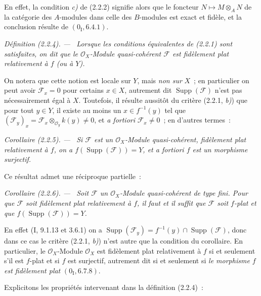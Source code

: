\documentclass[10pt,oneside]{book}
\newcommand{\oldpage}[2][]{%
  \setcounter{footnote}{0}%
  \marginpar{\scriptsize\textbf{#1}~|~#2}\ignorespaces}
\newenvironment{definition}[1][]{%
  \par\medskip\noindent\itshape Définition (#1). ---\ }{\par}
\newenvironment{corollary}[1][]{%
  \par\medskip\noindent\itshape Corollaire (#1). ---\ }{\par}
\begin{document}
En effet, la condition \emph{c)} de (2.2.2) signifie alors que le foncteur
$N\mapsto M\otimes_A N$ de la catégorie des $A$-modules dans celle des
$B$-modules est exact et fidèle, et la conclusion résulte de
$(0_{\mathrm I},6.4.1)$.

\begin{definition}[2.2.4]
\label{IV.2.2.4-fr}
Lorsque les conditions équivalentes de (2.2.1) sont satisfaites, on dit que
le $\mathcal O_X$-Module quasi-cohérent $\mathscr F$ est \emph{fidèlement plat
relativement à} $f$ (ou à $Y$).
\end{definition}

\oldpage[IV-2]{11}
On notera que cette notion est locale sur $Y$, mais \emph{non sur} $X$~; en
particulier on peut avoir $\mathscr F_x=0$ pour certains $x\in X$, autrement
dit $\operatorname{Supp}(\mathscr F)$ n'est pas nécessairement égal à $X$.
Toutefois, il résulte aussitôt du critère (2.2.1, \emph{b)}) que pour tout
$y\in Y$, il existe au moins un $x\in f^{-1}(y)$ tel que
$(\mathscr F_y)_x=\mathscr F_x\otimes_{\mathcal O_y}k(y)\neq0$, et
\emph{a fortiori} $\mathscr F_x\neq0$~; en d'autres termes~:

\begin{corollary}[2.2.5]
\label{IV.2.2.5-fr}
Si $\mathscr F$ est un $\mathcal O_X$-Module quasi-cohérent, fidèlement plat
relativement à $f$, on a $f(\operatorname{Supp}(\mathscr F))=Y$, et
\emph{a fortiori} $f$ est un morphisme surjectif.
\end{corollary}

Ce résultat admet une réciproque partielle~:

\begin{corollary}[2.2.6]
\label{IV.2.2.6-fr}
Soit $\mathscr F$ un $\mathcal O_X$-Module quasi-cohérent de type fini. Pour
que $\mathscr F$ soit fidèlement plat relativement à $f$, il faut et il
suffit que $\mathscr F$ soit $f$-plat et que
$f(\operatorname{Supp}(\mathscr F))=Y$.
\end{corollary}

En effet (I, 9.1.13 et 3.6.1) on a
$\operatorname{Supp}(\mathscr F_y)=f^{-1}(y)\cap\operatorname{Supp}(\mathscr F)$,
donc dans ce cas le critère (2.2.1, \emph{b)}) n'est autre que la condition du
corollaire. En particulier, le $\mathcal O_X$-Module $\mathcal O_X$ est
fidèlement plat relativement à $f$ si et seulement s'il est $f$-plat et si
$f$ est surjectif, autrement dit si et seulement si \emph{le morphisme $f$
est fidèlement plat} $(0_{\mathrm I},6.7.8)$.

Explicitons les propriétés intervenant dans la définition (2.2.4)~:
\end{document}
